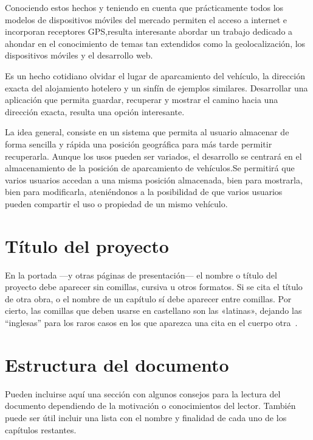 
Conociendo estos hechos y teniendo en cuenta que prácticamente todos los modelos de dispositivos móviles del mercado permiten el acceso a internet e incorporan receptores \ac{GPS},resulta interesante abordar un trabajo dedicado a ahondar en el conocimiento de temas tan extendidos como la geolocalización, los dispositivos móviles y el desarrollo web.

Es un hecho cotidiano olvidar el lugar de aparcamiento del vehículo, la dirección exacta del alojamiento hotelero y un sinfín de ejemplos similares. Desarrollar una aplicación que permita guardar, recuperar y mostrar el camino hacia una dirección exacta, resulta una opción interesante.

La idea general, consiste en un sistema que permita al usuario almacenar de forma sencilla y rápida una posición geográfica para más tarde permitir recuperarla. Aunque los usos pueden ser variados, el desarrollo se centrará en el almacenamiento de la posición de aparcamiento de vehículos.Se permitirá que varios usuarios accedan a una misma posición almacenada, bien para mostrarla, bien para modificarla, ateniéndonos a la posibilidad de que varios usuarios pueden compartir el uso o propiedad de un mismo vehículo.




\section{Título del proyecto}

En la portada ---y otras páginas de presentación--- el nombre o título del
proyecto debe aparecer sin comillas, cursiva u otros formatos. Si se cita el
título de otra obra, o el nombre de un capítulo sí debe aparecer entre
comillas. Por cierto, las comillas que deben usarse en castellano son las
«latinas», dejando las ``inglesas'' para los raros casos en los que aparezca una
cita en el cuerpo otra~\cite{sousa}.


\section{Estructura del documento}

Pueden incluirse aquí una sección con algunos consejos para la lectura del
documento dependiendo de la motivación o conocimientos del lector.  También
puede ser útil incluir una lista con el nombre y finalidad de cada uno de los
capítulos restantes.

